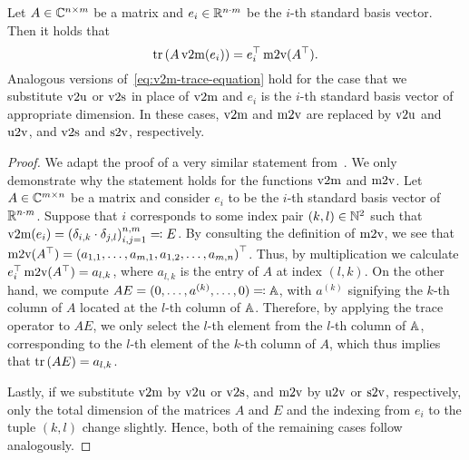 \begin{lemma}\label{lem:v2m-function-trace}
    Let $A \in \mathbb{C}^{n \times m}$ be a matrix and $e_i \in \mathbb{R}^{n \cdot m}$ be the $i$-th standard basis vector.
    Then it holds that
    \begin{equation}\label{eq:v2m-trace-equation}
        \mathop{}\!\mathrm{tr}\left(A \mathop{}\!\mathrm{v}2\mathrm{m}(e_i)\right) = e_i^{\top} \mathop{}\!\mathrm{m}2\mathrm{v}(A^{\top}).
    \end{equation}
    Analogous versions of~\eqref{eq:v2m-trace-equation} hold for the case that we substitute $\mathop{}\!\mathrm{v}2\mathrm{u}$ or $\mathop{}\!\mathrm{v}2\mathrm{s}$ in place of $\mathop{}\!\mathrm{v}2\mathrm{m}$ and $e_i$ is the $i$-th standard basis vector of appropriate dimension.
    In these cases, $\mathop{}\!\mathrm{v}2\mathrm{m}$ and $\mathop{}\!\mathrm{m}2\mathrm{v}$ are replaced by $\mathop{}\!\mathrm{v}2\mathrm{u}$ and $\mathop{}\!\mathrm{u}2\mathrm{v}$, and $\mathop{}\!\mathrm{v}2\mathrm{s}$ and $\mathop{}\!\mathrm{s}2\mathrm{v}$, respectively.
\end{lemma}

\begin{proof}
    We adapt the proof of a very similar statement from~\cite[Lemma~3.4]{SV2023}.
    We only demonstrate why the statement holds for the functions $\mathop{}\!\mathrm{v}2\mathrm{m}$ and $\mathop{}\!\mathrm{m}2\mathrm{v}$.
    Let $A \in \mathbb{C}^{m \times n}$ be a matrix and consider $e_i$ to be the $i$-th standard basis vector of $\mathbb{R}^{n \cdot m}$.
    Suppose that $i$ corresponds to some index pair $(k, l) \in \mathbb{N}^2$ such that $\mathop{}\!\mathrm{v}2\mathrm{m}(e_i) = {(\delta_{i, k} \cdot \delta_{j, l})}_{i, j = 1}^{n, m} \eqqcolon E$.
    By consulting the definition of $\mathop{}\!\mathrm{m}2\mathrm{v}$, we see that $\mathop{}\!\mathrm{m}2\mathrm{v}(A^{\top}) = {(a_{1, 1}, \dots, a_{m, 1}, a_{1, 2}, \dots, a_{m, n})}^{\top}$.
    Thus, by multiplication we calculate $e_i^{\top} \mathop{}\!\mathrm{m}2\mathrm{v}(A^{\top}) = a_{l, k}$, where $a_{l, k}$ is the entry of $A$ at index $(l, k)$.
    On the other hand, we compute $A E = (0, \dots, a^{(k)}, \dots, 0) \eqqcolon \mathbb{A}$, with $a^{(k)}$ signifying the $k$-th column of $A$ located at the $l$-th column of $\mathbb{A}$.
    Therefore, by applying the trace operator to $A E$, we only select the $l$-th element from the $l$-th column of $\mathbb{A}$, corresponding to the $l$-th element of the $k$-th column of $A$, which thus implies that $\mathop{}\!\mathrm{tr}\left(A E\right) = a_{l, k}$.

    Lastly, if we substitute $\mathop{}\!\mathrm{v}2\mathrm{m}$ by $\mathop{}\!\mathrm{v}2\mathrm{u}$ or $\mathop{}\!\mathrm{v}2\mathrm{s}$, and $\mathop{}\!\mathrm{m}2\mathrm{v}$ by $\mathop{}\!\mathrm{u}2\mathrm{v}$ or $\mathop{}\!\mathrm{s}2\mathrm{v}$, respectively, only the total dimension of the matrices $A$ and $E$ and the indexing from $e_i$ to the tuple $(k, l)$ change slightly.
    Hence, both of the remaining cases follow analogously.
\end{proof}

